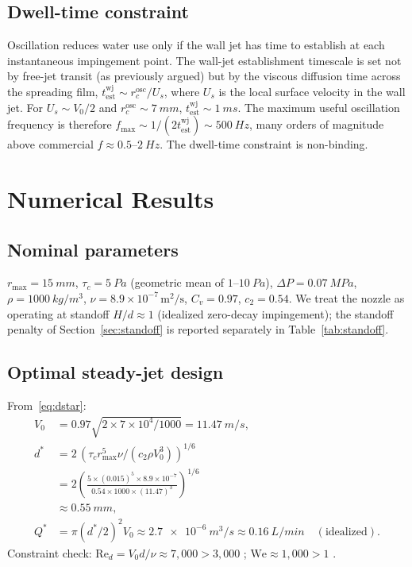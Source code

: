 \documentclass[aps,prfluids,reprint,amsmath,amssymb,floatfix]{revtex4-2}
\newcommand{\Rey}{\mathrm{Re}}
\newcommand{\We}{\mathrm{We}}
\begin{document}
\subsection{Dwell-time constraint}

Oscillation reduces water use only if the wall jet has time to establish
at each instantaneous impingement point. The wall-jet establishment
timescale is set not by free-jet transit (as previously argued) but by
the viscous diffusion time across the spreading film,
$t_\mathrm{est}^\mathrm{wj} \sim r_c^\mathrm{osc}/U_s$, where
$U_s$ is the local surface velocity in the wall jet. For $U_s \sim V_0/2$
and $r_c^\mathrm{osc} \sim \SI{7}{mm}$, $t_\mathrm{est}^\mathrm{wj}
\sim \SI{1}{ms}$. The maximum useful oscillation frequency is therefore
$f_\mathrm{max} \sim 1/(2 t_\mathrm{est}^\mathrm{wj}) \sim \SI{500}{Hz}$,
many orders of magnitude above commercial $f \approx 0.5$--$\SI{2}{Hz}$.
The dwell-time constraint is non-binding.

\section{Numerical Results}
\label{sec:numerics}

\subsection{Nominal parameters}

$r_\mathrm{max} = \SI{15}{mm}$, $\tau_c = \SI{5}{Pa}$ (geometric mean of
$1$--$\SI{10}{Pa}$), $\Delta P = \SI{0.07}{MPa}$, $\rho = \SI{1000}{kg/m^3}$,
$\nu = 8.9\times 10^{-7}\,\mathrm{m^2/s}$, $C_v = 0.97$, $c_2 = 0.54$.
We treat the nozzle as operating at standoff $H/d \approx 1$ (idealized
zero-decay impingement); the standoff penalty of Section~\ref{sec:standoff}
is reported separately in Table~\ref{tab:standoff}.

\subsection{Optimal steady-jet design}

From~\eqref{eq:dstar}:
\begin{align}
  V_0 &= 0.97\sqrt{2 \times 7\times 10^4/1000} = \SI{11.47}{m/s},\\
  d^* &= 2\,(\tau_c r_\mathrm{max}^5 \nu/(c_2\rho V_0^3))^{1/6}\\
      &= 2\left(\frac{5 \times (0.015)^5 \times 8.9\times 10^{-7}}
              {0.54 \times 1000 \times (11.47)^3}\right)^{1/6}\\
      &\approx \SI{0.55}{mm},\\
  Q^* &= \pi (d^*/2)^2 V_0 \approx \SI{2.7e-6}{m^3/s} \approx \SI{0.16}{L/min}
  \quad (\text{idealized}).
\end{align}
Constraint check: $\Rey_d = V_0 d/\nu \approx 7{,}000 > 3{,}000$ \checkmark;
$\We \approx 1{,}000 > 1$ \checkmark.
\end{document}
